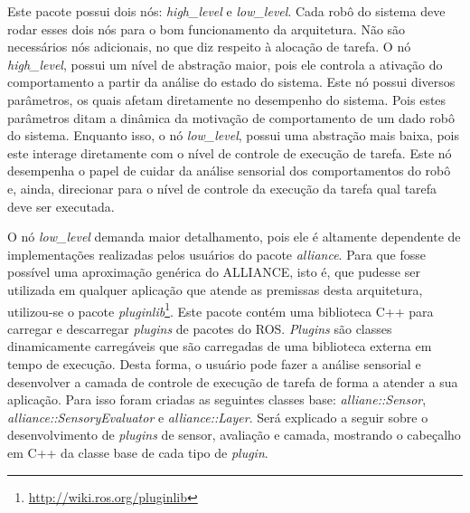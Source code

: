         Este pacote possui dois nós: \textit{high\_level} e \textit{low\_level}. Cada robô do sistema deve rodar esses dois nós para o bom funcionamento da arquitetura. Não são necessários nós adicionais, no que diz respeito à alocação de tarefa. O nó \textit{high\_level}, possui um nível de abstração maior, pois ele controla a ativação do comportamento a partir da análise do estado do sistema. Este nó possui diversos parâmetros, os quais afetam diretamente no desempenho do sistema. Pois estes parâmetros ditam a dinâmica da motivação de comportamento de um dado robô do sistema. Enquanto isso, o nó \textit{low\_level}, possui uma abstração mais baixa, pois este interage diretamente com o nível de controle de execução de tarefa. Este nó desempenha o papel de cuidar da análise sensorial dos comportamentos do robô e, ainda, direcionar para o nível de controle da execução da tarefa qual tarefa deve ser executada.
        
        O nó \textit{low\_level} demanda maior detalhamento, pois ele é altamente dependente de implementações realizadas pelos usuários do pacote \textit{alliance}. Para que fosse possível uma aproximação genérica do ALLIANCE, isto é, que pudesse ser utilizada em qualquer aplicação que atende as premissas desta arquitetura, utilizou-se o pacote \textit{pluginlib}\footnote{\url{http://wiki.ros.org/pluginlib}}. Este pacote contém uma biblioteca C++ para carregar e descarregar \textit{plugins} de pacotes do ROS. \textit{Plugins} são classes dinamicamente carregáveis que são carregadas de uma biblioteca externa em tempo de execução. Desta forma, o usuário pode fazer a análise sensorial e desenvolver a camada de controle de execução de tarefa de forma a atender a sua aplicação. Para isso foram criadas as seguintes classes base: \textit{alliane::Sensor}, \textit{alliance::SensoryEvaluator} e \textit{alliance::Layer}. Será explicado a seguir sobre o desenvolvimento de \textit{plugins} de sensor, avaliação e camada, mostrando o cabeçalho em C++ da classe base de cada tipo de \textit{plugin}.
        
        
